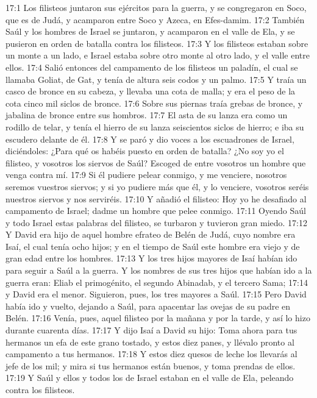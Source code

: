 17:1 Los filisteos juntaron sus ejércitos para la guerra, y se congregaron en Soco, que es de Judá, y acamparon entre Soco y Azeca, en Efes-damim.  
17:2 También Saúl y los hombres de Israel se juntaron, y acamparon en el valle de Ela, y se pusieron en orden de batalla contra los filisteos.  
17:3 Y los filisteos estaban sobre un monte a un lado, e Israel estaba sobre otro monte al otro lado, y el valle entre ellos.  
17:4 Salió entonces del campamento de los filisteos un paladín, el cual se llamaba Goliat, de Gat, y tenía de altura seis codos   y un palmo.  
17:5 Y traía un casco de bronce en su cabeza, y llevaba una cota de malla; y era el peso de la cota cinco mil siclos   de bronce.  
17:6 Sobre sus piernas traía grebas de bronce, y jabalina de bronce entre sus hombros.  
17:7 El asta de su lanza era como un rodillo de telar, y tenía el hierro de su lanza seiscientos siclos   de hierro; e iba su escudero delante de él.  
17:8 Y se paró y dio voces a los escuadrones de Israel, diciéndoles: ¿Para qué os habéis puesto en orden de batalla? ¿No soy yo el filisteo, y vosotros los siervos de Saúl? Escoged de entre vosotros un hombre que venga contra mí.  
17:9 Si él pudiere pelear conmigo, y me venciere, nosotros seremos vuestros siervos; y si yo pudiere más que él, y lo venciere, vosotros seréis nuestros siervos y nos serviréis.  
17:10 Y añadió el filisteo: Hoy yo he desafiado al campamento de Israel; dadme un hombre que pelee conmigo.  
17:11 Oyendo Saúl y todo Israel estas palabras del filisteo, se turbaron y tuvieron gran miedo.  
17:12 Y David era hijo de aquel hombre efrateo de Belén de Judá, cuyo nombre era Isaí, el cual tenía ocho hijos; y en el tiempo de Saúl este hombre era viejo y de gran edad entre los hombres.  
17:13 Y los tres hijos mayores de Isaí habían ido para seguir a Saúl a la guerra. Y los nombres de sus tres hijos que habían ido a la guerra eran: Eliab el primogénito, el segundo Abinadab, y el tercero Sama;  
17:14 y David era el menor. Siguieron, pues, los tres mayores a Saúl.  
17:15 Pero David había ido y vuelto, dejando a Saúl, para apacentar las ovejas de su padre en Belén.  
17:16 Venía, pues, aquel filisteo por la mañana y por la tarde, y así lo hizo durante cuarenta días.  
17:17 Y dijo Isaí a David su hijo: Toma ahora para tus hermanos un efa   de este grano tostado, y estos diez panes, y llévalo pronto al campamento a tus hermanos.  
17:18 Y estos diez quesos de leche los llevarás al jefe de los mil; y mira si tus hermanos están buenos, y toma prendas de ellos.  
17:19 Y Saúl y ellos y todos los de Israel estaban en el valle de Ela, peleando contra los filisteos.  
